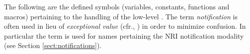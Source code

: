 \documentclass[../Dictionary.tex]{subfiles}
\begin{document}
\label{sect:fpe-dictionary}

The following are the defined symbols (variables, constants, functions
and macros) pertaining to the handling of the low-level
.  The term \emph{notification}
is often used in lieu of \emph{exceptional value} (cfr., \cite{2012:LIA1})
in order to minimize confusion.  In particular the term is used for
names pertaining the NRI notification modality (see Section
\ref{sect:notifications}).







\end{document}
